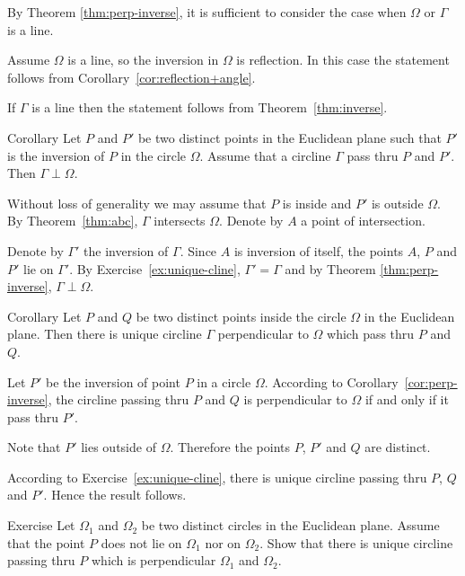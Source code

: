 By Theorem \ref{thm:perp-inverse}, it is sufficient to consider the case when $\Omega$ or $\Gamma$ is a line.

Assume $\Omega$ is a line, so the inversion in $\Omega$ is reflection.
In this case the statement follows from Corollary~\ref{cor:reflection+angle}.

If $\Gamma$ is a line then the statement follows from 
Theorem~\ref{thm:inverse}.
\qeds


\begin{thm}{Corollary}\label{cor:perp-inverse}
Let $P$ and $P'$ be two distinct points  in the Euclidean plane
such that $P'$ is the inversion of $P$ in the circle $\Omega$.
Assume that a circline $\Gamma$ pass thru $P$ and $P'$.
Then $\Gamma\perp\Omega$.
\end{thm}

Without loss of generality we may assume that $P$ is inside and $P'$ is outside $\Omega$.
By Theorem~\ref{thm:abc}, $\Gamma$ intersects $\Omega$.
Denote by $A$ a point of intersection.


Denote by $\Gamma'$ the inversion of $\Gamma$.
Since $A$ is inversion of itself, the points $A$, $P$ and $P'$ lie on  $\Gamma'$.
By Exercise~\ref{ex:unique-cline},
$\Gamma'=\Gamma$
and
by Theorem \ref{thm:perp-inverse}, $\Gamma\perp\Omega$.
\qeds

\begin{thm}{Corollary}\label{cor:h-line} Let $P$ and $Q$ be two distinct points inside the circle $\Omega$ in the Euclidean plane.
Then there is unique circline $\Gamma$ perpendicular to $\Omega$ which pass thru $P$ and $Q$.  
\end{thm}

Let $P'$ be the inversion of point $P$ in a circle $\Omega$.
According to Corollary~\ref{cor:perp-inverse},
the circline passing thru $P$ and $Q$ 
is perpendicular to $\Omega$ if and only if it pass thru $P'$.

Note that $P'$ lies outside of $\Omega$.
Therefore the points $P$, $P'$ and $Q$ are distinct.

According to Exercise~\ref{ex:unique-cline},
there is unique circline passing thru $P$, $Q$ and $P'$.
Hence the result follows.
\qeds

\begin{thm}{Exercise}\label{ex:cline-perp-to-two}
Let $\Omega_1$ and $\Omega_2$ be two distinct circles in the Euclidean plane.
Assume that the point $P$ does not lie on $\Omega_1$ nor on $\Omega_2$.
Show that there is unique circline passing thru $P$ which is perpendicular $\Omega_1$ and $\Omega_2$.
\end{thm}

